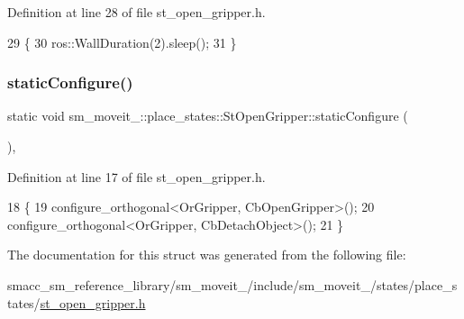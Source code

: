 Definition at line 28 of file st\+\_\+open\+\_\+gripper.\+h.


\begin{DoxyCode}
29             \{
30                 ros::WallDuration(2).sleep();
31             \}
\end{DoxyCode}
\mbox{\label{structsm__moveit__4_1_1place__states_1_1StOpenGripper_a83a52c51baf50a5519763fcf7a5f5a22}} 
\subsubsection{\texorpdfstring{static\+Configure()}{staticConfigure()}}
{\footnotesize\ttfamily static void sm\+\_\+moveit\+\_\+::place\+\_\+states\+::\+St\+Open\+Gripper\+::static\+Configure (\begin{DoxyParamCaption}{ }\end{DoxyParamCaption})\hspace{0.3cm}{\ttfamily [inline]}, {\ttfamily [static]}}



Definition at line 17 of file st\+\_\+open\+\_\+gripper.\+h.


\begin{DoxyCode}
18             \{
19                 configure\_orthogonal<OrGripper, CbOpenGripper>();
20                 configure\_orthogonal<OrGripper, CbDetachObject>();
21             \}
\end{DoxyCode}


The documentation for this struct was generated from the following file\+:\begin{DoxyCompactItemize}
\item 
smacc\+\_\+sm\+\_\+reference\+\_\+library/sm\+\_\+moveit\+\_/include/sm\+\_\+moveit\+\_/states/place\+\_\+states/\hyperlink{4_2include_2sm__moveit__4_2states_2place__states_2st__open__gripper_8h}{st\+\_\+open\+\_\+gripper.\+h}\end{DoxyCompactItemize}

